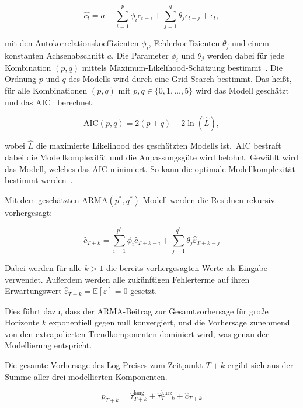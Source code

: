 \begin{equation}
    \hat{c_t} = a + \sum_{i=1}^{p} \phi_i c_{t-i} + \sum_{j=1}^{q} \theta_j \epsilon_{t-j} + \epsilon_t,
\end{equation}

mit den Autokorrelationskoeffizienten $\phi_i$, Fehlerkoeffizienten $\theta_j$ und einem konstanten Achsenabschnitt $a$. Die Parameter $\phi_i$ und $\theta_j$ werden dabei für jede Kombination $(p,q)$ mittels Maximum-Likelihood-Schätzung bestimmt~\cite{box2015time}. Die Ordnung $p$ und $q$ des Modells wird durch eine Grid-Search bestimmt. Das heißt, für alle Kombinationen $(p,q)$ mit $p,q \in \{0, 1, \ldots, 5\}$ wird das Modell geschätzt und das \ac{AIC}~\cite{akaike1974new} berechnet:

\begin{equation}
    \text{AIC}(p,q) = 2(p+q) - 2\ln(\hat{L}),
\end{equation}

wobei $\hat{L}$ die maximierte Likelihood des geschätzten Modells ist.~\ac{AIC} bestraft dabei die Modellkomplexität und die Anpassungsgüte wird belohnt. Gewählt wird das Modell, welches das \ac{AIC} minimiert. So kann die optimale Modellkomplexität bestimmt werden~\cite{hyndman2008automatic}.

Mit dem geschätzten \ac{ARMA}$(p^*, q^*)$-Modell werden die Residuen rekursiv vorhergesagt:

\begin{equation}
    \hat{c}_{T+k}
    = \sum_{i=1}^{p^*} \phi_i \hat{c}_{T+k-i}
    + \sum_{j=1}^{q^*} \theta_j \hat{\varepsilon}_{T+k-j}
\end{equation}

Dabei werden für alle $k>1$ die bereits vorhergesagten Werte als Eingabe verwendet. Außerdem werden alle zukünftigen Fehlerterme auf ihren Erwartungswert $\hat{\varepsilon}_{T+k} = \mathbb{E}[\varepsilon] = 0$ gesetzt.

Dies führt dazu, dass der \ac{ARMA}-Beitrag zur Gesamtvorhersage für große Horizonte $k$ exponentiell gegen null konvergiert, und die Vorhersage zunehmend von den extrapolierten Trendkomponenten dominiert wird, was genau der Modellierung entspricht.

Die gesamte Vorhersage des Log-Preises zum Zeitpunkt $T+k$ ergibt sich aus der Summe aller drei modellierten Komponenten.

\begin{equation}
    \hat{p}_{T+k}
    = \hat{\tau}^{\text{lang}}_{T+k}
    + \hat{\tau}^{\text{kurz}}_{T+k}
    + \hat{c}_{T+k}
\end{equation}

